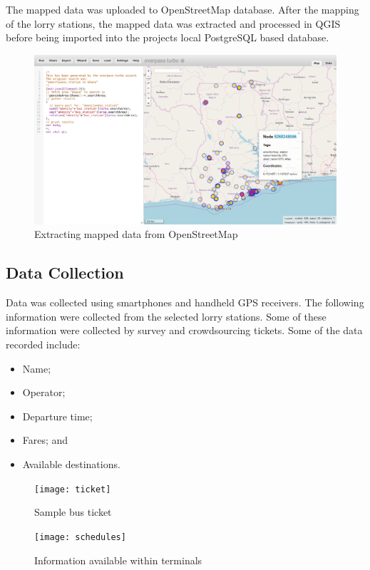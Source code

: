 The mapped data was uploaded to OpenStreetMap database. After the mapping of the lorry stations, the mapped data was extracted and processed in QGIS before being imported into the projects local PostgreSQL based database.

\begin{figure}[H]
	\centering
	\includegraphics[width=0.9\linewidth]{3/figures/overpass}
	\caption[Extracting mapped data from OpenStreetMap]{Extracting mapped data from OpenStreetMap}
	\label{fig:overpass}
\end{figure}


\subsection{Data Collection}
Data was collected using smartphones and handheld GPS receivers. The following information were collected from the selected lorry stations. Some of these information were collected by survey and crowdsourcing tickets. Some of the data recorded include:
\begin{itemize}
	\item Name;
	\item Operator;
	\item Departure time;
	\item Fares; and 
	\item Available destinations.
\end{itemize}

\begin{figure}[H]
	\centering
	\texttt{[image: ticket]}
	\caption[Sample bus ticket]{Sample bus ticket}
	\label{fig:ticket}
\end{figure}

\begin{figure}[H]
	\centering
	\texttt{[image: schedules]}
	\caption[Information available within terminals]{Information available within terminals}
	\label{fig:schedules}
\end{figure}


